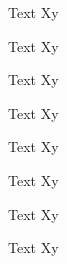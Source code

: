 \documentclass{article}
\begin{document}
\begin{minipage}{1.5cm}
\begin{adjustbox}{bgimage=example-image}
    Text Xy
\end{adjustbox}

\begin{adjustbox}{bgimage={clip,trim=10 10 10 10,rotate=45}{example-image}}
    Text Xy
\end{adjustbox}

\begin{adjustbox}{bgimage*={width=.5\pwidth,center=\pwidth}{example-image}}
    Text Xy
\end{adjustbox}

\begin{adjustbox}{bgimage*={clip,trim=10 10 10 10,rotate=45,width=.5\pwidth,right=\pwidth}{example-image}}
    Text Xy
\end{adjustbox}

\begin{adjustbox}{fgimage=example-image}
    Text Xy
\end{adjustbox}

\begin{adjustbox}{fgimage={clip,trim=10 10 10 10,rotate=45}{example-image}}
    Text Xy
\end{adjustbox}

\begin{adjustbox}{fgimage*={width=.5\pwidth,center=\pwidth}{example-image}}
    Text Xy
\end{adjustbox}

\begin{adjustbox}{fgimage*={clip,trim=10 10 10 10,rotate=45,width=.5\pwidth,right=\pwidth}{example-image}}
    Text Xy
\end{adjustbox}

\end{minipage}
\hspace{1mm}
\end{document}
